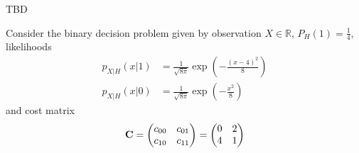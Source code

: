 \question[20]

\ifspanish
TBD
\else

Consider the binary decision problem given by observation $X \in \mathbb{R}$, $P_H(1)=\frac14$, likelihoods
\begin{align*}
p_{X|H}(x|1) &= \frac{1}{\sqrt{8\pi}} \exp\left(-\frac{(x-4)^2}8 \right)   \\
p_{X|H}(x|0) &= \frac{1}{\sqrt{8\pi}} \exp\left(-\frac{x^2}8     \right)
\end{align*}
and cost matrix
\begin{align*}
{\bf C}
    = \begin{pmatrix} 
      c_{00} & c_{01}  \\
      c_{10} & c_{11}
      \end{pmatrix}
    = \begin{pmatrix} 
      0 & 2  \\
      4 & 1
      \end{pmatrix}
\end{align*}

\fi

